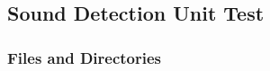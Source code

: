 \documentclass{CSSRforAfrica}
\begin{document}
  
%  
%

 
\subsection{Sound Detection Unit Test} 
\label{subsection:sound_detetction_test}


\subsubsection{Files and Directories}
 
\end{document}
